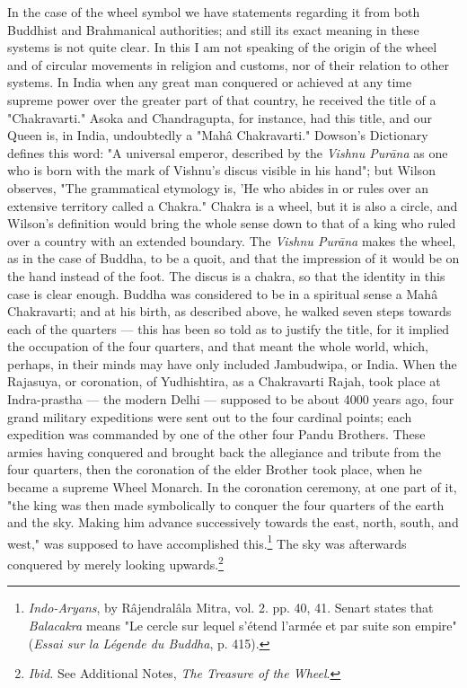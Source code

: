 \documentclass[a4paper, 11pt, oneside, polutonikogreek, english]{article}
\begin{document}
In the case of the wheel symbol we have statements regarding it from both Buddhist and Brahmanical authorities; and still its exact meaning in these systems is not quite clear. In this I am not speaking of the origin of the wheel and of circular movements in religion and customs, nor of their relation to other systems. In India when any great man conquered or achieved at any time supreme power over the greater part of that country, he received the title of a "Chakravarti." Asoka and Chandragupta, for instance, had this title, and our Queen is, in India, undoubtedly a "Mahâ Chakravarti." Dowson's Dictionary defines this word: "A universal emperor, described by the \emph{Vishnu Purāna} as one who is born with the mark of Vishnu's discus visible in his hand"; but Wilson observes, "The grammatical etymology is, 'He who abides in or rules over an extensive territory called a Chakra." Chakra is a wheel, but it is also a circle, and Wilson's definition would bring the whole sense down to that of a king who ruled over a country with an extended boundary. The \emph{Vishnu Purāna} makes the wheel, as in the case of Buddha, to be a quoit, and that the impression of it would be on the hand instead of the foot. The discus is a chakra, so that the identity in this case is clear enough. Buddha was considered to be in a spiritual sense a Mahâ Chakravarti; and at his birth, as described above, he walked seven steps towards each of the quarters --- this has been so told as to justify the title, for it implied the occupation of the four quarters, and that meant the whole world, which, perhaps, in their minds may have only included Jambudwipa, or India. When the Rajasuya, or coronation, of Yudhishtira, as a Chakravarti Rajah, took place at Indra-prastha --- the modern Delhi --- supposed to be about 4000 years ago, four grand military expeditions were sent out to the four cardinal points; each expedition was commanded by one of the other four Pandu Brothers. These armies having conquered and brought back the allegiance and tribute from the four quarters, then the coronation of the elder Brother took place, when he became a supreme Wheel Monarch. In the coronation ceremony, at one part of it, "the king was then made symbolically to conquer the four quarters of the earth and the sky. Making him advance successively towards the east, north, south, and west," was supposed to have accomplished this.\footnote{\emph{Indo-Aryans}, by Râjendralâla Mitra, vol. 2. pp. 40, 41. Senart states that \emph{Balacakra} means "Le cercle sur lequel s'étend l'armée et par suite son empire" (\emph{Essai sur la Légende du Buddha}, p. 415).} The sky was afterwards conquered by merely looking upwards.\footnote{\emph{Ibid.} See Additional Notes, \emph{The Treasure of the Wheel}.}
\end{document}
